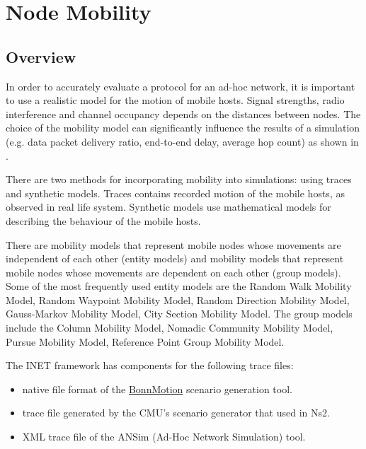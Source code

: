 
\chapter{Node Mobility}
\label{cha:mobility}


\section{Overview}

In order to accurately evaluate a protocol for an ad-hoc network,
it is important to use a realistic model for the motion of mobile
hosts. Signal strengths, radio interference and channel occupancy
depends on the distances between nodes. The choice of the mobility
model can significantly influence the results of a simulation
(e.g. data packet delivery ratio, end-to-end delay, average hop count)
as shown in \cite{Camp02asurvey}.

There are two methods for incorporating mobility into simulations:
using traces and synthetic models. Traces contains recorded motion
of the mobile hosts, as observed in real life system. Synthetic models
use mathematical models for describing the behaviour of the mobile hosts.

There are mobility models that represent mobile nodes whose movements
are independent of each other (entity models) and mobility models
that represent mobile nodes whose movements are dependent on each other
(group models). Some of the most frequently used entity models are the
Random Walk Mobility Model, Random Waypoint Mobility Model, Random
Direction Mobility Model, Gauss-Markov Mobility Model, City Section
Mobility Model. The group models include the Column Mobility Model,
Nomadic Community Mobility Model, Pursue Mobility Model,
Reference Point Group Mobility Model.

The INET framework has components for the following trace files:

\begin{itemize}
\item {} native file format of the
    \href{http://net.cs.uni-bonn.de/wg/cs/applications/bonnmotion/}{BonnMotion}
    scenario generation tool.
\item {} trace file generated by the CMU's scenario generator that used in Ns2.
\item {} XML trace file of the ANSim (Ad-Hoc Network Simulation) tool.
\end{itemize}


